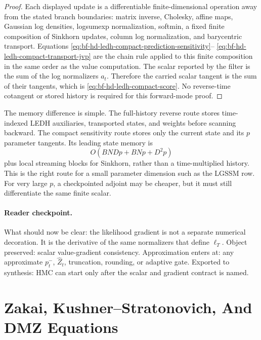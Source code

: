\begin{proof}
Each displayed update is a differentiable finite-dimensional operation away
from the stated branch boundaries: matrix inverse, Cholesky, affine maps,
Gaussian log densities, logsumexp normalization, softmin, a fixed finite
composition of Sinkhorn updates, column log normalization, and barycentric
transport.  Equations
\eqref{eq:bf-hd-ledh-compact-prediction-sensitivity}--
\eqref{eq:bf-hd-ledh-compact-transport-jvp} are the chain rule applied to this
finite composition in the same order as the value computation.  The scalar
reported by the filter is the sum of the log normalizers \(a_t\).  Therefore
the carried scalar tangent is the sum of their tangents, which is
\eqref{eq:bf-hd-ledh-compact-score}.  No reverse-time cotangent or stored
history is required for this forward-mode proof.
\end{proof}

The memory difference is simple.  The full-history reverse route stores
time-indexed LEDH auxiliaries, transported states, and weights before scanning
backward.  The compact sensitivity route stores only the current state and its
\(p\) parameter tangents.  Its leading state memory is
\begin{equation}
  O(BNDp+BNp+D^2p)
\end{equation}
plus local streaming blocks for Sinkhorn, rather than a time-multiplied
history.  This is the right route for a small parameter dimension such as the
LGSSM row.  For very large \(p\), a checkpointed adjoint may be cheaper, but it
must still differentiate the same finite scalar.

\paragraph{Reader checkpoint.}
What should now be clear: the likelihood gradient is not a separate numerical
decoration.  It is the derivative of the same normalizers that define
\(\ell_T\).  Object preserved: scalar value-gradient consistency.  Approximation
enters at: any approximate \(p_t^-\), \(\widehat Z_t\), truncation, rounding, or
adaptive gate.  Exported to synthesis: HMC can start only after the scalar and
gradient contract is named.

\section{Zakai, Kushner--Stratonovich, And DMZ Equations}
\label{sec:bf-hd-zakai-dmz}

